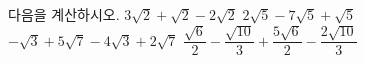 다음을 계산하시오.
 $3\sqrt{2}+\sqrt{2}-2\sqrt{2}$
 $2\sqrt{5}-7\sqrt{5}+\sqrt{5}$
 $-\sqrt{3}+5\sqrt{7}-4\sqrt{3}+2\sqrt{7}$
 $\dfrac{\sqrt{6}}{2}-\dfrac{\sqrt{10}}{3}+\dfrac{5\sqrt{6}}{2}-\dfrac{2\sqrt{10}}{3}$
